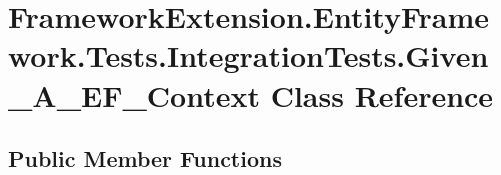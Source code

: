 \hypertarget{class_framework_extension_1_1_entity_framework_1_1_tests_1_1_integration_tests_1_1_given___a___e_f___context}{\section{Framework\-Extension.\-Entity\-Framework.\-Tests.\-Integration\-Tests.\-Given\-\_\-\-A\-\_\-\-E\-F\-\_\-\-Context Class Reference}
\label{class_framework_extension_1_1_entity_framework_1_1_tests_1_1_integration_tests_1_1_given___a___e_f___context}
}
\subsection*{Public Member Functions}
